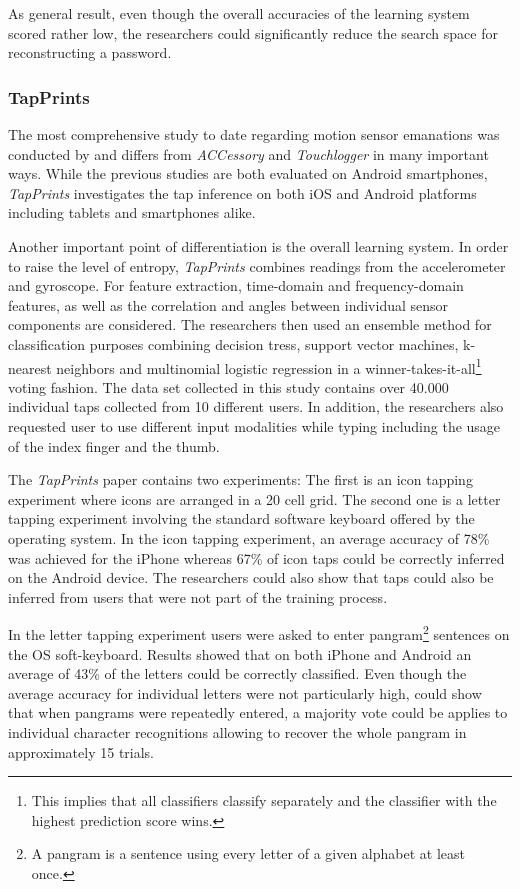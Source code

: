 As general result, even though the overall accuracies of the learning system scored rather low, the researchers could significantly reduce the search space for reconstructing a password.

\subsubsection{TapPrints}

The most comprehensive study to date regarding motion sensor emanations was conducted by \citeauthor{Tapprints} and differs from \textit{ACCessory} and \textit{Touchlogger} in many important ways. While the previous studies are both evaluated on Android smartphones, \textit{TapPrints} investigates the tap inference on both iOS and Android platforms including tablets and smartphones alike. 

Another important point of differentiation is the overall learning system. In order to raise the level of entropy, \textit{TapPrints} combines readings from the accelerometer and gyroscope. For feature extraction, time-domain and frequency-domain features, as well as the correlation and angles between individual sensor components are considered. The researchers then used an ensemble method for classification purposes combining decision tress, support vector machines, k-nearest neighbors and multinomial logistic regression in a winner-takes-it-all\footnote{This implies that all classifiers classify separately and the classifier with the highest prediction score wins.} voting fashion. The data set collected in this study contains over 40.000 individual taps collected from 10 different users. In addition, the researchers also requested user to use different input modalities while typing including the usage of the index finger and the thumb.

The \textit{TapPrints} paper contains two experiments: The first is an icon tapping experiment where icons are arranged in a 20 cell grid. The second one is a letter tapping experiment involving the standard software keyboard offered by the operating system. In the icon tapping experiment, an average accuracy of 78\% was achieved for the iPhone whereas 67\% of icon taps could be correctly inferred on the Android device. The researchers could also show that taps could also be inferred from users that were not part of the training process.

In the letter tapping experiment users were asked to enter pangram\footnote{A pangram is a sentence using every letter of a given alphabet at least once.} sentences on the OS soft-keyboard. Results showed that on both iPhone and Android an average of 43\% of the letters could be correctly classified. Even though the average accuracy for individual letters were not particularly high, \citeauthor{Tapprints} could show that when pangrams were repeatedly entered, a majority vote could be applies to individual character recognitions allowing to recover the whole pangram in approximately 15 trials. 

